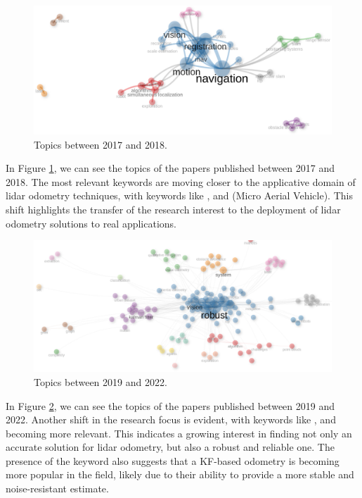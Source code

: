 \documentclass{article}
\begin{document}
\begin{figure}[!htbp]
    \centering
    \includegraphics[width=1.0\textwidth]{img/topics_2017_2018.png}
    \caption{Topics between 2017 and 2018.}
    \label{fig:topics_2016_2018}
\end{figure}

In Figure \ref{fig:topics_2016_2018}, we can see the topics of the papers published between 2017 and 2018. The most relevant keywords are moving closer to the applicative domain of lidar odometry techniques, with keywords like ,  and  (Micro Aerial Vehicle). This shift highlights the transfer of the research interest to the deployment of lidar odometry solutions to real applications.

\begin{figure}[!htbp]
    \centering
    \includegraphics[width=1.0\textwidth]{img/topics_2019_2022.png}
    \caption{Topics between 2019 and 2022.}
    \label{fig:topics_2019_2022}
\end{figure}

In Figure \ref{fig:topics_2019_2022}, we can see the topics of the papers published between 2019 and 2022. Another shift in the research focus is evident, with keywords like ,  and  becoming more relevant. This indicates a growing interest in finding not only an accurate solution for lidar odometry, but also a robust and reliable one. The presence of the  keyword also suggests that a KF-based odometry is becoming more popular in the field, likely due to their ability to provide a more stable and noise-resistant estimate.
\end{document}
